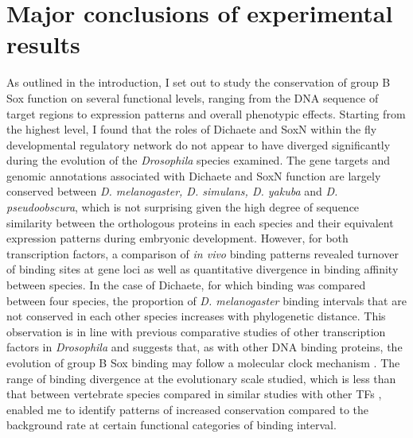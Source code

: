 \section{Major conclusions of experimental results} 
As outlined in the introduction, I set out to study the conservation of group B Sox function on several functional levels, ranging from the DNA sequence of target regions to expression patterns and overall phenotypic effects. Starting from the highest level, I found that the roles of Dichaete and SoxN within the fly developmental regulatory network do not appear to have diverged significantly during the evolution of the \emph{Drosophila} species examined. The gene targets and genomic annotations associated with Dichaete and SoxN function are largely conserved between \emph{D. melanogaster, D. simulans, D. yakuba} and \emph{D. pseudoobscura}, which is not surprising given the high degree of sequence similarity between the orthologous proteins in each species and their equivalent expression patterns during embryonic development. However, for both transcription factors, a comparison of \emph{in vivo} binding patterns revealed turnover of binding sites at gene loci as well as quantitative divergence in binding affinity between species. In the case of Dichaete, for which binding was compared between four species, the proportion of \emph{D. melanogaster} binding intervals that are not conserved in each other species increases with phylogenetic distance. This observation is in line with previous comparative studies of other transcription factors in \emph{Drosophila} and suggests that, as with other DNA binding proteins, the evolution of group B Sox binding may follow a molecular clock mechanism \citep{bradley_binding_2010,he_high_2011,paris_extensive_2013}. The range of binding divergence at the evolutionary scale studied, which is less than that between vertebrate species compared in similar studies with other TFs \citep{odom_tissue-specific_2007,schmidt_five-vertebrate_2010,stefflova_cooperativity_2013,villar_evolution_2014}, enabled me to identify patterns of increased conservation compared to the background rate at certain functional categories of binding interval.

